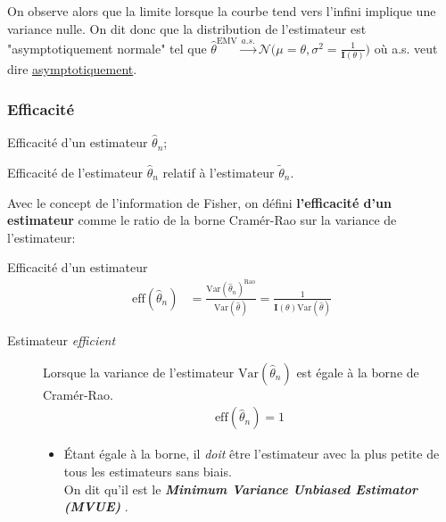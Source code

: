 \documentclass[10pt, french]{article}
\begin{document}
\begin{multicols*}{2}
On observe alors que la limite lorsque la \og courbe \fg{} tend vers l'infini implique une variance nulle. On dit donc que la distribution de l'estimateur est "asymptotiquement normale" tel que $\hat\theta^{\text{EMV}} \overset{a.s.}{\rightarrow} \mathcal{N}\Big(\mu = \theta, \sigma^{2} = \frac{1}{\bm{I}(\theta)}\Big)$ où a.s. veut dire \hyperlink{asympto}{asymptotiquement}.

\columnbreak
\subsubsection{Efficacité}
\begin{distributions}[Notation]
\begin{description}[font = \normalfont]
	\item[$\text{eff}(\hat{\theta}_{n})$]	Efficacité d'un estimateur $\hat{\theta}_{n}$;
	\item[$\text{eff}(\hat\theta_{n}, \tilde\theta_{n})$]	Efficacité de l'estimateur $\hat{\theta}_{n}$ relatif à l'estimateur $\tilde{\theta}_{n}$.
\end{description}
\end{distributions}

Avec le concept de l'information de Fisher, on défini \textbf{l'efficacité d'un estimateur} comme le ratio de la borne Cramér-Rao sur la variance de l'estimateur:
\begin{algo}{Efficacité d'un estimateur}
\begin{align*}
	\text{eff}(\hat{\theta}_{n})
	&=	\frac{\text{Var}(\hat{\theta}_{n})^{\text{Rao}}}{\text{Var}(\hat{\theta})} 
	=	\frac{1}{\bm{I}(\theta)\text{Var}(\hat{\theta})}
\end{align*}
\tcbline
\begin{description}
	\item[Estimateur \og \textit{efficient} \fg{}]	Lorsque la variance de l'estimateur $\text{Var}(\hat{\theta}_{n})$ est égale à la borne de Cramér-Rao.
		\begin{align*}
		\text{eff}(\hat{\theta}_{n}) = 1
		\end{align*}
	\begin{itemize}[leftmargin = *]
	\item	Étant égale à la borne, il \textit{doit} être l'estimateur avec la plus petite de tous les estimateurs sans biais.\\
	 		On dit qu'il est le \og \textbf{\textit{Minimum Variance Unbiased Estimator (MVUE)}} \fg{}. 
	\end{itemize}
\end{description}
\end{algo}


\end{multicols*}
\end{document}
